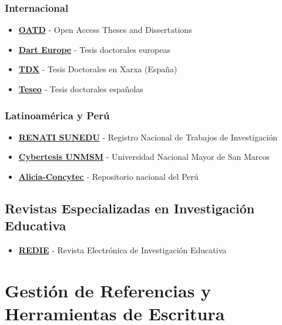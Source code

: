\documentclass[
  jou,
  floatsintext,
  longtable,
  a4paper,
  nolmodern,
  notxfonts,
  notimes,
  12pt,
  colorlinks=true,linkcolor=blue,citecolor=blue,urlcolor=blue]{apa7}
\providecommand{\tightlist}{%
  \setlength{\itemsep}{0pt}\setlength{\parskip}{0pt}}
\begin{document}
\subsubsection{Internacional}\label{internacional}

\begin{itemize}
\tightlist
\item
  \textbf{\href{https://oatd.org/}{OATD}} - Open Access Theses and
  Dissertations
\item
  \textbf{\href{https://www.dart-europe.eu/}{Dart Europe}} - Tesis
  doctorales europeas
\item
  \textbf{\href{https://www.tesisenred.net/}{TDX}} - Tesis Doctorales en
  Xarxa (España)
\item
  \textbf{\href{https://www.educacion.gob.es/teseo/irGestionarConsulta.do}{Teseo}}
  - Tesis doctorales españolas
\end{itemize}

\subsubsection{Latinoamérica y Perú}\label{latinoamuxe9rica-y-peruxfa}

\begin{itemize}
\tightlist
\item
  \textbf{\href{https://renati.sunedu.gob.pe/}{RENATI SUNEDU}} -
  Registro Nacional de Trabajos de Investigación
\item
  \textbf{\href{https://cybertesis.unmsm.edu.pe/}{Cybertesis UNMSM}} -
  Universidad Nacional Mayor de San Marcos
\item
  \textbf{\href{https://alicia.concytec.gob.pe/vufind/}{Alicia-Concytec}}
  - Repositorio nacional del Perú
\end{itemize}

\subsection{Revistas Especializadas en Investigación
Educativa}\label{revistas-especializadas-en-investigaciuxf3n-educativa}

\begin{itemize}
\tightlist
\item
  \textbf{\href{https://redie.uabc.mx/redie/search}{REDIE}} - Revista
  Electrónica de Investigación Educativa
\end{itemize}

\section{Gestión de Referencias y Herramientas de
Escritura}\label{gestiuxf3n-de-referencias-y-herramientas-de-escritura}
\end{document}
